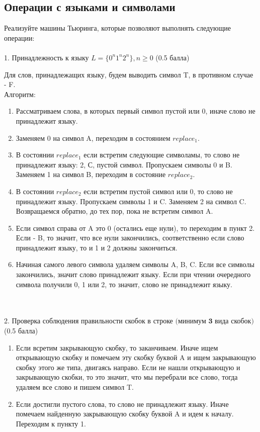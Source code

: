 \documentclass{article}
\begin{document}
\newpage
\subsection{Операции с языками и символами}

Реализуйте машины Тьюринга, которые позволяют выполнять следующие операции:
\\\\1. $\textbf{Принадлежность к языку}$ $L = \{ 0^n1^n2^n \}, n \ge 0$ (0.5 балла)
    
Для слов, принадлежащих языку, будем выводить символ T, в противном случае - F.\\
Алгоритм:
\begin{enumerate}
    \item Рассматриваем слова, в которых первый символ пустой или 0, иначе слово не принадлежит языку.
    \item Заменяем 0 на символ A, переходим в состоянием $replace_1$.
    \item В состоянии $replace_1$ если встретим следующие символамы, то слово не принадлежит языку: 2, С, пустой символ. Пропускаем символы 0 и B. Заменяем 1 на символ B, переходим в состояние $replace_2$.
    \item В состоянии $replace_2$ если встретим пустой символ или 0, то слово не принадлежит языку. Пропускаем символы 1 и C. Заменяем 2 на символ C. Возвращаемся обратно, до тех пор, пока не встретим символ A.
    \item Если символ справа от A это 0 (остались еще нули), то переходим в пункт 2. Если - B, то значит, что все нули закончились, соответственно если слово принадлежит языку, то и 1 и 2 должны закончиться. 
    \item Начиная самого левого символа удаляем символы A, B, C. Если все символы закончились, значит слово принадлежит языку. Если при чтении очередного символа получили 0, 1 или 2, то значит, слово не принадлежит языку. 
\end{enumerate}
 
 
\\\\2. $\textbf{Проверка соблюдения правильности скобок в строке (минимум 3 вида скобок)}$ (0.5 балла)

\begin{enumerate}
    \item Если всретим закрывающую скобку, то заканчиваем. Иначе ищем открывающую скобку и помечаем эту скобку буквой A и ищем закрывающую скобку этого же типа, двигаясь направо. Если не нашли открывающую и закрывающую скобки, то это значит, что мы перебрали все слово, тогда удаляем все слово и пишем символ T.
    \item Если достигли пустого слова, то слово не принадлежит языку. Иначе помечаем найденную закрывающую скобку буквой A и идем к началу. Переходим к пункту 1.
\end{enumerate}
\end{document}
